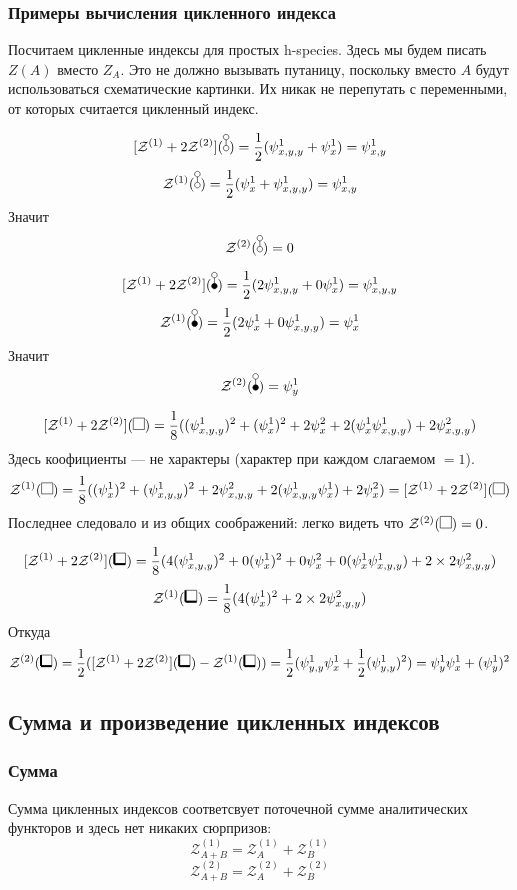 \subsubsection{Примеры вычисления цикленного индекса}
Посчитаем цикленные индексы для простых h-species.
Здесь мы будем писать $Z(A)$ вместо $Z_A$. Это не должно вызывать путаницу,
поскольку вместо $A$ будут использоваться схематические картинки. Их
никак не перепутать с переменными, от которых считается цикленный индекс. 
\begin{example}
$$
\Zfull(\dA) = \frac{1}{2}(\psi_{x,y,y}^1 + \psi_{x}^1) = \psi_{x,y}^1
$$
$$
\mathcal Z^{(1)}(\dA) = \frac{1}{2}(\psi_{x}^1 + \psi_{x, y, y}^1) = \psi_{x,y}^1
$$
Значит
$$
\mathcal Z^{(2)}(\dA) = 0
$$
\end{example}
\begin{example}
$$
\Zfull(\dB) = \frac{1}{2}(2\psi_{x,y,y}^1 + 0\psi_{x}^1) = \psi_{x,y,y}^1
$$
$$
\mathcal Z^{(1)}(\dB) = \frac{1}{2}(2\psi_{x}^1 + 0\psi_{x, y, y}^1) = \psi_{x}^1
$$
Значит
$$
\mathcal Z^{(2)}(\dB) = \psi_{y}^1
$$
\end{example}
\begin{example}
$$
\Zfull(\dAA) = \frac{1}{8}((\psi_{x,y,y}^1)^2 + (\psi_{x}^1)^2 + 2\psi_{x}^2 +
2(\psi_x^1\psi_{x,y,y}^1) + 2\psi_{x,y,y}^2)
$$
Здесь коофициенты --- не характеры (характер при каждом слагаемом $= 1$).
$$
\mathcal Z^{(1)}(\dAA) = \frac{1}{8}((\psi_{x}^1)^2 + (\psi_{x, y, y}^1)^2 +
2\psi_{x, y, y}^2 + 2(\psi_{x, y, y}^1\psi_{x}^1) + 2\psi_{x}^2) = \Zfull(\dAA)
$$
Последнее следовало и из общих соображений: легко видеть что $\mathcal
Z^{(2)}(\dAA) = 0$.
\end{example}
\begin{example}
$$
\Zfull(\dBB) = \frac{1}{8}(4(\psi_{x,y,y}^1)^2 + 0(\psi_{x}^1)^2 + 0\psi_{x}^2
+ 0(\psi_x^1\psi_{x,y,y}^1) + 2\times2\psi_{x,y,y}^2)
$$
$$
\mathcal Z^{(1)}(\dBB) = \frac{1}{8}(4(\psi_{x}^1)^2 + 2\times2\psi_{x,y,y}^2)
$$
Откуда
$$
\mathcal Z^{(2)}(\dBB) = \frac{1}{2}(\Zfull(\dBB) - \mathcal
Z^{(1)}(\dBB)) = \frac{1}{2}(\psi_{y,y}^1\psi_{x}^1 +
\frac{1}{2}(\psi_{y, y}^1)^2) = \psi_{y}^1\psi_{x}^1 + (\psi_{y}^1)^2 $$
\end{example}

\subsection{Сумма и произведение цикленных индексов}
\subsubsection{Сумма}
Сумма цикленных индексов соответсвует поточечной сумме аналитических
функторов и здесь нет никаких сюрпризов:
$$
\mathcal Z_{A + B}^{(1)} = \mathcal Z_A^{(1)} + \mathcal Z_B^{(1)}
$$
$$
\mathcal Z_{A + B}^{(2)} = \mathcal Z_A^{(2)} + \mathcal Z_B^{(2)}
$$
